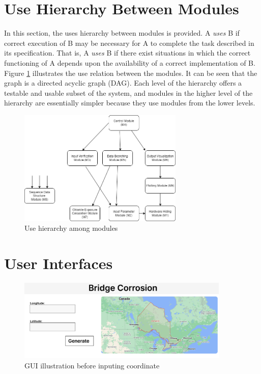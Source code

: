 \documentclass[12pt, titlepage]{article}
\begin{document}
\section{Use Hierarchy Between Modules} \label{SecUse}

In this section, the uses hierarchy between modules is
provided. A {\em uses} B if
correct execution of B may be necessary for A to complete the task described in
its specification. That is, A {\em uses} B if there exist situations in which
the correct functioning of A depends upon the availability of a correct
implementation of B.  Figure \ref{FigUH} illustrates the use relation between
the modules. It can be seen that the graph is a directed acyclic graph
(DAG). Each level of the hierarchy offers a testable and usable subset of the
system, and modules in the higher level of the hierarchy are essentially simpler
because they use modules from the lower levels.

\begin{figure}[H]
\centering
\includegraphics[width=0.7\textwidth]{UsesHierarchy.png}
\caption{Use hierarchy among modules}
\label{FigUH}
\end{figure}


\section{User Interfaces}

\begin{figure}[H]
\centering
\includegraphics[width=0.9\textwidth]{GUI1.png}
\caption{GUI illustration before inputing coordinate}
\label{FigGUI1}
\end{figure}
\end{document}
